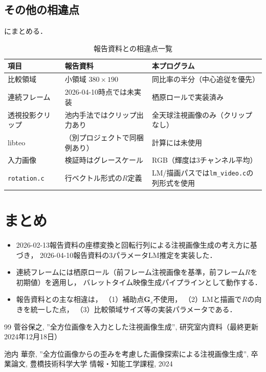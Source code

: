 \documentclass{ltjsarticle}          %
\begin{document}
\subsection{その他の相違点}
にまとめる．

\begin{table}[H]
  \centering
  \caption{報告資料との相違点一覧}
  \label{tab:diff_summary}
  \begin{tabular}{p{3.2cm}|p{4.5cm}|p{4.5cm}}
    \hline
    項目 & 報告資料 & 本プログラム \\
    \hline
    比較領域 &
      小領域 $380 \times 190$ &
      同比率の半分（中心追従を優先） \\
    連続フレーム &
      2026-04-10時点では未実装 &
      栖原ロールで実装済み \\
    透視投影クリップ &
      池内手法ではクリップ出力あり &
      全天球注視画像のみ（クリップなし） \\
    libteo &
      （別プロジェクトで同梱例あり） &
      計算には未使用 \\
    入力画像 &
      検証時はグレースケール &
      RGB（輝度は3チャンネル平均） \\
    \texttt{rotation.c} &
      行ベクトル形式の$R$定義 &
      LM/描画パスでは\texttt{lm\_video.c}の列形式を使用 \\
    \hline
  \end{tabular}
\end{table}

\section{まとめ}
\begin{itemize}
  \item 2026-02-13報告資料の座標変換と回転行列による注視画像生成の考え方に基づき，
    2026-04-10報告資料の3パラメータLM推定を実装した．

  \item 連続フレームには栖原ロール（前フレーム注視画像を基準，前フレーム$R$を初期値）を適用し，
    バレットタイム映像生成パイプラインとして動作する．

  \item 報告資料との主な相違は，
    （1）補助点$\bm{G}_s$不使用，
    （2）LMと描画で$R$の向きを統一した点，
    （3）比較領域サイズ等の実装パラメータである．
\end{itemize}

\begin{thebibliography}{99}
    菅谷保之, ''全方位画像を入力とした注視画像生成'', 研究室内資料（最終更新2024年12月18日）

   池内 華奈, ''全方位画像からの歪みを考慮した画像探索による注視画像生成'', 卒業論文, 豊橋技術科学大学 情報・知能工学課程, 2024
\end{thebibliography}
\end{document}
